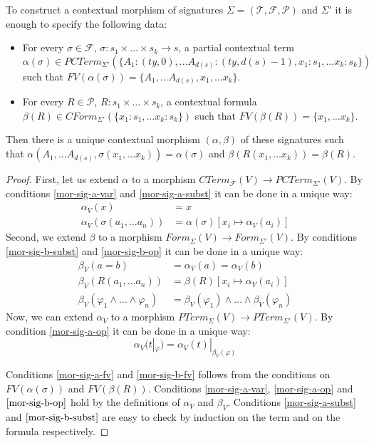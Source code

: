 \documentclass{amsart}
\theoremstyle{definition}
\theoremstyle{remark}
\numberwithin{figure}{section}
\begin{document}
\begin{prop}
To construct a contextual morphism of signatures $\Sigma = (\mathcal{T},\mathcal{F},\mathcal{P})$ and $\Sigma'$ it is enough to specify the following data:
\begin{itemize}
\item For every $\sigma \in \mathcal{F}$, $\sigma : s_1 \times \ldots \times s_k \to s$,
    a partial contextual term $\alpha(\sigma) \in PCTerm_{\Sigma'}(\{ A_1 : (ty,0), \ldots A_{d(s)} : (ty,d(s)-1), x_1 : s_1, \ldots x_k : s_k \})$
    such that $FV(\alpha(\sigma)) = \{ A_1, \ldots A_{d(s)}, x_1, \ldots x_k \}$.
\item For every $R \in \mathcal{P}$, $R : s_1 \times \ldots \times s_k$,
    a contextual formula $\beta(R) \in CForm_{\Sigma'}(\{ x_1 : s_1, \ldots x_k : s_k \})$ such that $FV(\beta(R)) = \{ x_1, \ldots x_k \}$.
\end{itemize}
Then there is a unique contextual morphism $(\alpha,\beta)$ of these signatures such that
$\alpha(A_1, \ldots A_{d(s)}, \sigma(x_1, \ldots x_k)) = \alpha(\sigma)$ and $\beta(R(x_1, \ldots x_k)) = \beta(R)$.
\end{prop}
\begin{proof}
First, let us extend $\alpha$ to a morphism $CTerm_\mathcal{F}(V) \to PCTerm_{\Sigma'}(V)$.
By conditions \eqref{mor-sig-a-var} and \eqref{mor-sig-a-subst} it can be done in a unique way:
\begin{align*}
\alpha_V(x) & = x \\
\alpha_V(\sigma(a_1, \ldots a_n)) & = \alpha(\sigma)[x_i \mapsto \alpha_V(a_i)]
\end{align*}
Second, we extend $\beta$ to a morphism $Form_\Sigma(V) \to Form_{\Sigma'}(V)$.
By conditions \eqref{mor-sig-b-subst} and \eqref{mor-sig-b-op} it can be done in a unique way:
\begin{align*}
\beta_V(a = b) & = \alpha_V(a) = \alpha_V(b) \\
\beta_V(R(a_1, \ldots a_n)) & = \beta(R)[x_i \mapsto \alpha_V(a_i)] \\
\beta_V(\varphi_1 \land \ldots \land \varphi_n) & = \beta_V(\varphi_1) \land \ldots \land \beta_V(\varphi_n)
\end{align*}
Now, we can extend $\alpha_V$ to a morphism $PTerm_\Sigma(V) \to PTerm_{\Sigma'}(V)$.
By condition \eqref{mor-sig-a-op} it can be done in a unique way:
\[ \alpha_V(t|_\varphi) = \alpha_V(t)|_{\beta_V(\varphi)} \]

Conditions \eqref{mor-sig-a-fv} and \eqref{mor-sig-b-fv} follows from the conditions on $FV(\alpha(\sigma))$ and $FV(\beta(R))$.
Conditions \eqref{mor-sig-a-var}, \eqref{mor-sig-a-op} and $\eqref{mor-sig-b-op}$ hold by the definitions of $\alpha_V$ and $\beta_V$.
Conditions \eqref{mor-sig-a-subst} and $\eqref{mor-sig-b-subst}$ are easy to check by induction on the term and on the formula respectively.
\end{proof}
\end{document}
